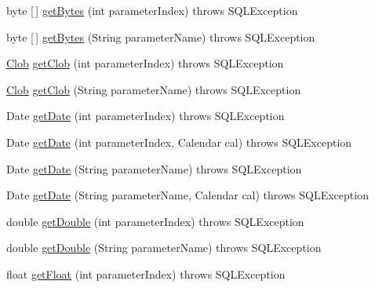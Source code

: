 \begin{DoxyCompactItemize}
\item 
byte \mbox{[}$\,$\mbox{]} \mbox{\hyperlink{classcom_1_1mysql_1_1cj_1_1jdbc_1_1_callable_statement_a5178d2ef3a082635ffcb28fae3f209de}{get\+Bytes}} (int parameter\+Index)  throws S\+Q\+L\+Exception 
\item 
byte \mbox{[}$\,$\mbox{]} \mbox{\hyperlink{classcom_1_1mysql_1_1cj_1_1jdbc_1_1_callable_statement_a4184f57e3f8e6092f90a93d7feb05af8}{get\+Bytes}} (String parameter\+Name)  throws S\+Q\+L\+Exception 
\item 
\mbox{\hyperlink{classcom_1_1mysql_1_1cj_1_1jdbc_1_1_clob}{Clob}} \mbox{\hyperlink{classcom_1_1mysql_1_1cj_1_1jdbc_1_1_callable_statement_a24eab53dc2c5d9c0ca81d4ef1f9c4a68}{get\+Clob}} (int parameter\+Index)  throws S\+Q\+L\+Exception 
\item 
\mbox{\hyperlink{classcom_1_1mysql_1_1cj_1_1jdbc_1_1_clob}{Clob}} \mbox{\hyperlink{classcom_1_1mysql_1_1cj_1_1jdbc_1_1_callable_statement_a1d3b051adc98dcf98fe93762440fe605}{get\+Clob}} (String parameter\+Name)  throws S\+Q\+L\+Exception 
\item 
Date \mbox{\hyperlink{classcom_1_1mysql_1_1cj_1_1jdbc_1_1_callable_statement_a9280a0b05265e2def720a51151f8dc75}{get\+Date}} (int parameter\+Index)  throws S\+Q\+L\+Exception 
\item 
Date \mbox{\hyperlink{classcom_1_1mysql_1_1cj_1_1jdbc_1_1_callable_statement_a5ecd5b8ebee139edcf6cf5c6b79dee9d}{get\+Date}} (int parameter\+Index, Calendar cal)  throws S\+Q\+L\+Exception 
\item 
Date \mbox{\hyperlink{classcom_1_1mysql_1_1cj_1_1jdbc_1_1_callable_statement_aca6a4c290274e62c2f8f100e0c746728}{get\+Date}} (String parameter\+Name)  throws S\+Q\+L\+Exception 
\item 
Date \mbox{\hyperlink{classcom_1_1mysql_1_1cj_1_1jdbc_1_1_callable_statement_a5fa3659ab861ea6df99551e4811d7b22}{get\+Date}} (String parameter\+Name, Calendar cal)  throws S\+Q\+L\+Exception 
\item 
double \mbox{\hyperlink{classcom_1_1mysql_1_1cj_1_1jdbc_1_1_callable_statement_ab147f6da64dfa262ea1bed1a7c955c71}{get\+Double}} (int parameter\+Index)  throws S\+Q\+L\+Exception 
\item 
double \mbox{\hyperlink{classcom_1_1mysql_1_1cj_1_1jdbc_1_1_callable_statement_af7ea2799796fa396896066e857542937}{get\+Double}} (String parameter\+Name)  throws S\+Q\+L\+Exception 
\item 
float \mbox{\hyperlink{classcom_1_1mysql_1_1cj_1_1jdbc_1_1_callable_statement_ac5562c83206c020fe6126aafce30bd31}{get\+Float}} (int parameter\+Index)  throws S\+Q\+L\+Exception 

\end{DoxyCompactItemize}
